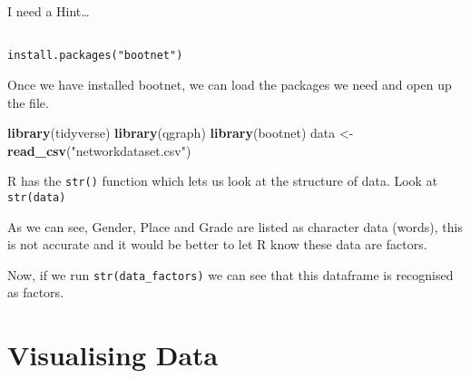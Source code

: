 \documentclass[]{book}
\newenvironment{Shaded}{\begin{snugshade}}{\end{snugshade}}
\newcommand{\DataTypeTok}[1]{\textcolor[rgb]{0.13,0.29,0.53}{#1}}
\newcommand{\KeywordTok}[1]{\textcolor[rgb]{0.13,0.29,0.53}{\textbf{#1}}}
\newcommand{\NormalTok}[1]{#1}
\newcommand{\OperatorTok}[1]{\textcolor[rgb]{0.81,0.36,0.00}{\textbf{#1}}}
\newcommand{\StringTok}[1]{\textcolor[rgb]{0.31,0.60,0.02}{#1}}
\begin{document}
I need a Hint\ldots{}

\begin{verbatim}

install.packages("bootnet")
\end{verbatim}

Once we have installed bootnet, we can load the packages we need and open up the file.

\begin{Shaded}
\begin{Highlighting}[]
\KeywordTok{library}\NormalTok{(tidyverse)}
\KeywordTok{library}\NormalTok{(qgraph)}
\KeywordTok{library}\NormalTok{(bootnet)}
\NormalTok{data <-}\StringTok{ }\KeywordTok{read_csv}\NormalTok{(}\StringTok{"networkdataset.csv"}\NormalTok{)}
\end{Highlighting}
\end{Shaded}

R has the \texttt{str()} function which lets us look at the structure of data. Look at \texttt{str(data)}

As we can see, Gender, Place and Grade are listed as character data (words), this is not accurate and it would be better to let R know these data are factors.

\begin{Shaded}
\end{Shaded}

Now, if we run \texttt{str(data\_factors)} we can see that this dataframe is recognised as factors.

\hypertarget{visualising-data}{%
\section{Visualising Data}\label{visualising-data}}
\end{document}
